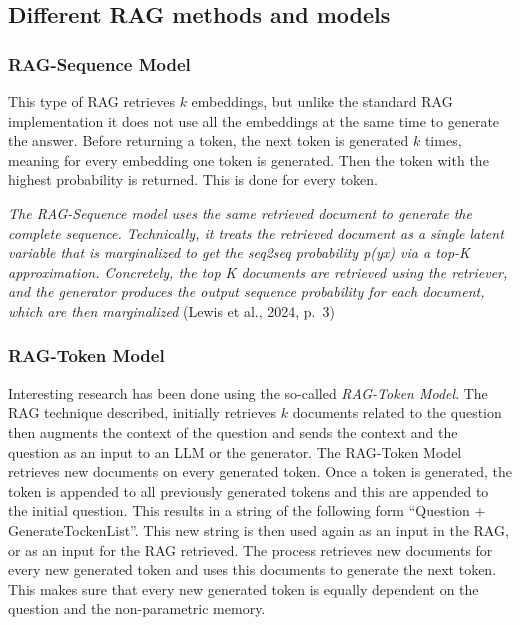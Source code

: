 \documentclass{wseas}
\begin{document}
\subsection{Different RAG methods and
models}\label{different-rag-methods-and-models}

\subsubsection{RAG-Sequence Model}

This type of RAG retrieves \(k\) embeddings, but unlike the standard RAG
implementation it does not use all the embeddings at the same time to
generate the answer. Before returning a token, the next token is
generated \(k\) times, meaning for every embedding one token is
generated. Then the token with the highest probability is returned. This
is done for every token.

\emph{The RAG-Sequence model uses the same retrieved document to
generate the complete sequence. Technically, it treats the retrieved
document as a single latent variable that is marginalized to get the
seq2seq probability p(y\textbar x) via a top-K approximation.
Concretely, the top K documents are retrieved using the retriever, and
the generator produces the output sequence probability for each
document, which are then marginalized} (Lewis et al., 2024, p.~3) \cite{cite3}

\subsubsection{RAG-Token Model}

Interesting research has been done using the so-called \emph{RAG-Token
Model}. The RAG technique described, initially retrieves \(k\) documents
related to the question then augments the context of the question and
sends the context and the question as an input to an LLM or the
generator. The RAG-Token Model retrieves new documents on every
generated token. Once a token is generated, the token is appended to all
previously generated tokens and this are appended to the initial
question. This results in a string of the following form ``Question +
GenerateTockenList''. This new string is then used again as an input in
the RAG, or as an input for the RAG retrieved. The process retrieves new
documents for every new generated token and uses this documents to
generate the next token. This makes sure that every new generated token
is equally dependent on the question and the non-parametric memory.
\end{document}
